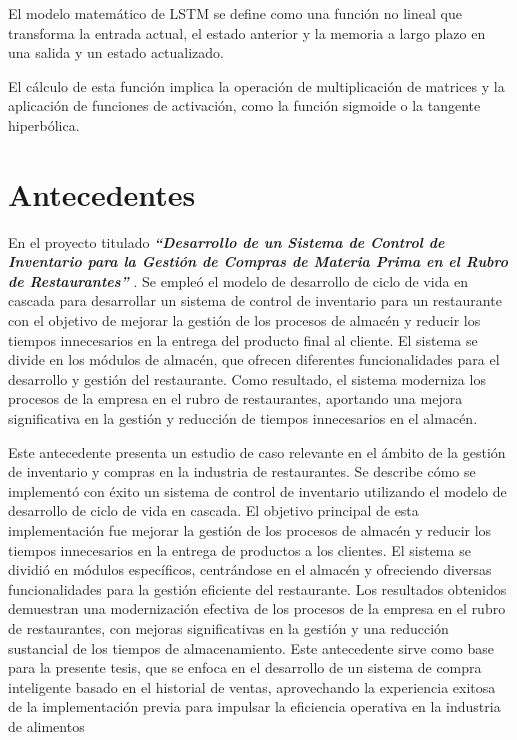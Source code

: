 El modelo matemático de LSTM se define como una función no lineal que transforma la entrada actual, el estado anterior y la memoria a largo plazo en una salida y un estado actualizado.

El cálculo de esta función implica la  operación  de  multiplicación  de  matrices  y  la  aplicación  de  funciones  de  activación,  como la función sigmoide o la tangente hiperbólica\cite{tomas2023prediccion}.



\section{Antecedentes}
En el proyecto titulado \textbf{\textit{“Desarrollo de un Sistema de Control de Inventario para la Gestión de Compras de Materia Prima en el Rubro de Restaurantes”}} \cite{condorena2017desarrollo}. Se empleó el modelo de desarrollo de ciclo de vida en cascada para desarrollar un sistema de control de inventario para un restaurante con el objetivo de mejorar la gestión de los procesos de almacén y reducir los tiempos innecesarios en la entrega del producto final al cliente. El sistema se divide en los módulos de almacén, que ofrecen diferentes funcionalidades para el desarrollo y gestión del restaurante. Como resultado, el sistema moderniza los procesos de la empresa en el rubro de restaurantes, aportando una mejora significativa en la gestión y reducción de tiempos innecesarios en el almacén. 

\vspace{1\baselineskip}
Este antecedente presenta un estudio de caso relevante en el ámbito de la gestión de inventario y compras en la industria de restaurantes. Se describe cómo se implementó con éxito un sistema de control de inventario utilizando el modelo de desarrollo de ciclo de vida en cascada. El objetivo principal de esta implementación fue mejorar la gestión de los procesos de almacén y reducir los tiempos innecesarios en la entrega de productos a los clientes. El sistema se dividió en módulos específicos, centrándose en el almacén y ofreciendo diversas funcionalidades para la gestión eficiente del restaurante. Los resultados obtenidos demuestran una modernización efectiva de los procesos de la empresa en el rubro de restaurantes, con mejoras significativas en la gestión y una reducción sustancial de los tiempos de almacenamiento. Este antecedente sirve como base para la presente tesis, que se enfoca en el desarrollo de un sistema de compra inteligente basado en el historial de ventas, aprovechando la experiencia exitosa de la implementación previa para impulsar la eficiencia operativa en la industria de alimentos

